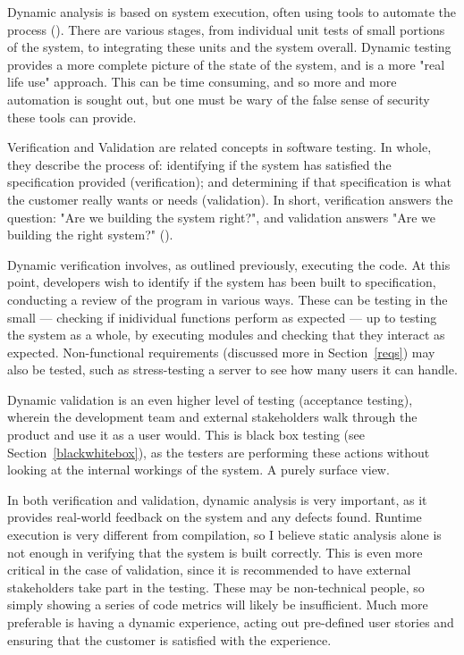 \documentclass[12pt]{article}
\begin{document}
Dynamic analysis is based on system execution, often using tools to automate the process (). There are various stages, from individual unit tests of small portions of the system, to integrating these units and the system overall. Dynamic testing provides a more complete picture of the state of the system, and is a more "real life use" approach. This can be time consuming, and so more and more automation is sought out, but one must be wary of the false sense of security these tools can provide.

Verification and Validation are related concepts in software testing. In whole, they describe the process of: identifying if the system has satisfied the specification provided (verification); and determining if that specification is what the customer really wants or needs (validation). In short, verification answers the question: "Are we building the system right?", and validation answers "Are we building the right system?" (). 

Dynamic verification involves, as outlined previously, executing the code. At this point, developers wish to identify if the system has been built to specification, conducting a review of the program in various ways. These can be testing in the small --- checking if inidividual functions perform as expected --- up to testing the system as a whole, by executing modules and checking that they interact as expected. Non-functional requirements (discussed more in Section~\ref{reqs}) may also be tested, such as stress-testing a server to see how many users it can handle.

Dynamic validation is an even higher level of testing (acceptance testing), wherein the development team and external stakeholders walk through the product and use it as a user would. This is black box testing (see Section~\ref{blackwhitebox}), as the testers are performing these actions without looking at the internal workings of the system. A purely surface view.

In both verification and validation, dynamic analysis is very important, as it provides real-world feedback on the system and any defects found. Runtime execution is very different from compilation, so I believe static analysis alone is not enough in verifying that the system is built correctly. This is even more critical in the case of validation, since it is recommended to have external stakeholders take part in the testing. These may be non-technical people, so simply showing a series of code metrics will likely be insufficient. Much more preferable is having a dynamic experience, acting out pre-defined user stories and ensuring that the customer is satisfied with the experience.
\end{document}
